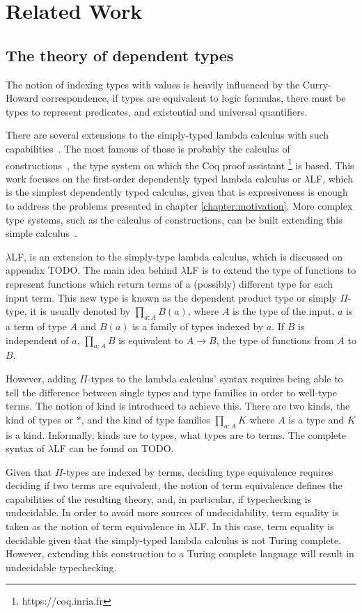 \chapter{Related Work} \label{chapter:related_work}

\section{The theory of dependent types}
The notion of indexing types with values is heavily influenced by the Curry-Howard
correspondence, if types are equivalent to logic formulas, there must be types
to represent predicates, and existential and universal quantifiers.

There are several extensions to the simply-typed lambda calculus with such
capabilities~\cite{pierce}. The most famous of those is probably the calculus of
constructions~\cite{coc}, the type system on which the Coq proof assistant
\footnote{https://coq.inria.fr} is based. This work focuses on the first-order
dependently typed lambda calculus or $\lambda$LF, which is the simplest
dependently typed calculus, given that is expresiveness is enough to address the
problems presented in chapter \ref{chapter:motivation}. More complex type
systems, such as the calculus of constructions, can be built extending this
simple calculus~\cite{pierce}.

$\lambda$LF, is an extension to the simply-type lambda calculus, which is
discussed on appendix TODO. The main idea behind $\lambda$LF is to extend the
type of functions to represent functions which return terms of a (possibly)
different type for each input term. This new type is known as the dependent
product type or simply $\Pi$-type, it is usually denoted by $\prod_{a:A} B(a)$,
where $A$ is the type of the input, $a$ is a term of type $A$ and $B(a)$ is a
family of types indexed by $a$. If $B$ is independent of $a$, $\prod_{a:A} B$ is
equivalent to $A \rightarrow B$, the type of functions from $A$ to $B$.

However, adding $\Pi$-types to the lambda calculus' syntax requires being able
to tell the difference between single types and type families in order to
well-type terms. The notion of kind is introduced to achieve this. There are two
kinds, the kind of types or $*$, and the kind of type families $\prod_{a:A}K$
where $A$ is a type and $K$ is a kind. Informally, kinds are to types, what
types are to terms. The complete syntax of $\lambda$LF can be found on TODO.

Given that $\Pi$-types are indexed by terms, deciding type equivalence requires
deciding if two terms are equivalent, the notion of term equivalence defines the
capabilities of the resulting theory, and, in particular, if typechecking is
undecidable. In order to avoid more sources of undecidability, term equality is
taken as the notion of term equivalence in $\lambda$LF. In this case, term
equality is decidable given that the simply-typed lambda calculus is not Turing
complete. However, extending this construction to a Turing complete language
will result in undecidable typechecking.

